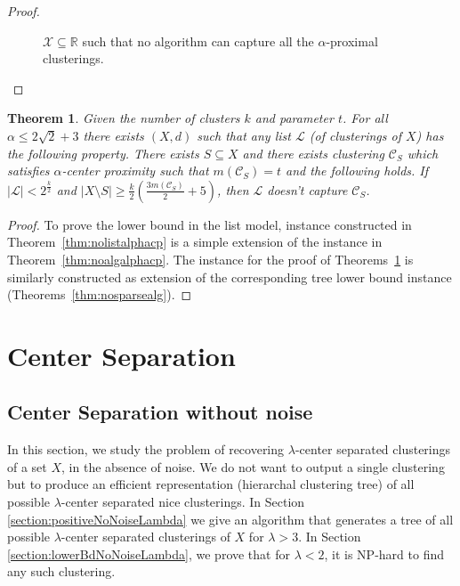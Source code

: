 \documentclass[12pt]{article}
\newtheorem{theorem}{Theorem}
\newcommand{\mc}{\mathcal}
\begin{document}
\begin{proof}
\begin{figure}[!t]
\begin{center}
\end{center}
\vspace{-4mm}
\caption{$\mc X \subseteq \mathbb{R}$ such that no algorithm can capture all the $\alpha$-proximal clusterings. } 
\label{fig:nosparsealg}
\end{figure}
\end{proof}

\begin{theorem}
\label{thm:nosparselistalphacp}
Given the number of clusters $k$ and parameter $t$. For all $\alpha \le 2\sqrt{2}+3$ there exists $(X, d)$ such that any list $\mc L$ (of clusterings of $X$) has  the following property. There exists $S \subseteq X$ and there exists clustering $\mc C_{S}$ which satisfies $\alpha$-center proximity such that $m(\mc C_{S}) = t$ and the following holds. If $|\mc L| < 2^{\frac{k}{2}}$ and $|X \setminus S|\ge \frac{k}{2}(\frac{3m(\mc C_{S})}{2}+5)$, then $\mc L$ doesn't capture $\mc C_{S}$.
\end{theorem}
\begin{proof}
To prove the lower bound in the list model, instance constructed in Theorem~\ref{thm:nolistalphacp} is a simple extension of the instance in Theorem~\ref{thm:noalgalphacp}. The instance for the proof of Theorems~\ref{thm:nosparselistalphacp} is similarly constructed as extension of the corresponding tree lower bound instance (Theorems~\ref{thm:nosparsealg}).
\end{proof}

\section{Center Separation}
\label{sec:cs}
 
\subsection{Center Separation without noise}
\label{sec:cswithout}

In this section, we study the problem of recovering $\lambda$-center separated clusterings of a set $X$, in the absence of noise. We do not want to output a single clustering but to produce an efficient representation (hierarchal clustering tree) of all possible $\lambda$-center separated nice clusterings. In Section \ref{section:positiveNoNoiseLambda} we give an algorithm that generates a tree of all possible $\lambda$-center separated clusterings of $X$ for $\lambda > 3$.  In Section \ref{section:lowerBdNoNoiseLambda}, we prove that for  $\lambda < 2$, it is NP-hard to find any such clustering.
\end{document}
